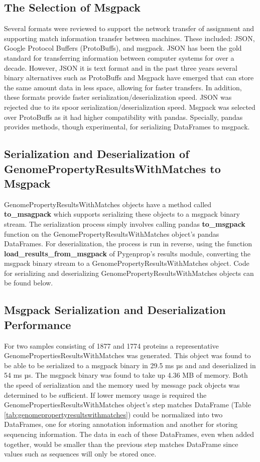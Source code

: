 \subsection{The Selection of Msgpack}

Several formats were reviewed to support the network transfer of assignment and supporting match information transfer between machines. These included: JSON, Google Protocol Buffers (ProtoBuffs), and msgpack. JSON has been the gold standard for transferring information between computer systems for over a decade. However, JSON it is text format and in the past three years several binary alternatives such as ProtoBuffs and Msgpack have emerged that can store the same amount data in less space, allowing for faster transfers. In addition, these formats provide faster serialization/deserialization speed. JSON was rejected due to its spoor serialization/deserialization speed. Msgpack was selected over ProtoBuffs as it had higher compatibility with pandas. Specially, pandas provides methods, though experimental, for serializing DataFrames to msgpack.

\subsection{Serialization and Deserialization of GenomePropertyResultsWithMatches to Msgpack}

GenomePropertyResultsWithMatches objects have a method called \textbf{to\_msagpack} which supports serializing these objects to a msgpack binary stream. The serialization process simply involves calling pandas \textbf{to\_msgpack} function on the GenomePropertyResultsWithMatches object's pandas DataFrames. For deserialization, the process is run in reverse, using the function \textbf{load\_results\_from\_msgpack} of Pygenprop's results module, converting the msgpack binary stream to a GenomePropertyResultsWithMatches object. Code for serializing and deserializing GenomePropertyResultsWithMatches objects can be found below.

\subsection{Msgpack Serialization and Deserialization Performance}

For two samples consisting of 1877 and 1774 proteins a representative GenomePropertiesResultsWithMatches was generated. This object was found to be able to be serialized to a msgpack binary in 29.5 ms  µs and and deserialized in 54 ms  µs. The msgpack binary was found to take up 4.36 MB of memory. Both the speed of serialization and the memory used by message pack objects was determined to be sufficient. If lower memory usage is required the GenomePropertiesResultsWithMatches object's step matches DataFrame (Table \ref{tab:genomepropertyresultswithmatches}) could be normalized into two DataFrames, one for storing annotation information and another for storing sequencing information. The data in each of these DataFrames, even when added together, would be smaller than the previous step matches DataFrame since values such as sequences will only be stored once.

